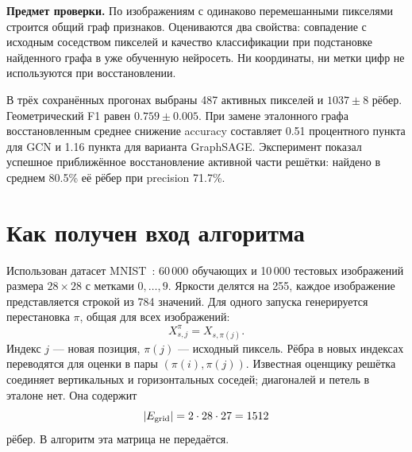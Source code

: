 \documentclass[11pt,a4paper]{article}
\begin{document}

\noindent\textbf{Предмет проверки.}
По изображениям с одинаково перемешанными пикселями строится общий граф признаков.
Оцениваются два свойства: совпадение с исходным соседством пикселей и качество
классификации при подстановке найденного графа в уже обученную нейросеть.
Ни координаты, ни метки цифр не используются при восстановлении.
\par В трёх сохранённых прогонах выбраны 487 активных пикселей и
$1037\pm8$ рёбер. Геометрический F1 равен $0.759\pm0.005$.
При замене эталонного графа восстановленным среднее снижение accuracy составляет
0.51 процентного пункта для GCN и 1.16 пункта для варианта GraphSAGE.
Эксперимент показал успешное приближённое восстановление активной части решётки:
найдено в среднем 80.5\% её рёбер при precision 71.7\%.

\section{Как получен вход алгоритма}
Использован датасет MNIST~\cite{mnist}: 60\,000 обучающих и 10\,000 тестовых
изображений размера $28\times28$ с метками $0,\ldots,9$.
Яркости делятся на 255, каждое изображение представляется строкой из 784 значений.
Для одного запуска генерируется перестановка $\pi$, общая для всех изображений:
\begin{equation}
 X^\pi_{s,j}=X_{s,\pi(j)}.
\end{equation}
Индекс $j$ --- новая позиция, $\pi(j)$ --- исходный пиксель.
Рёбра в новых индексах переводятся для оценки в пары $(\pi(i),\pi(j))$.
Известная оценщику решётка соединяет вертикальных и горизонтальных соседей;
диагоналей и петель в эталоне нет. Она содержит
\begin{equation}
 |E_{\rm grid}|=2\cdot28\cdot27=1512
\end{equation}
рёбер. В алгоритм эта матрица не передаётся.
\end{document}
